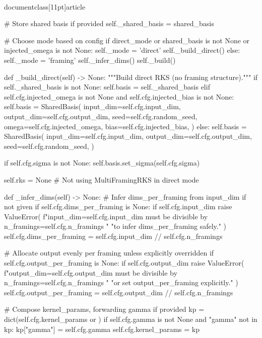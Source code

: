 \\documentclass[11pt]{article}
\begin{document}
\begin{CodeBlock}
        # Store shared basis if provided
        self._shared_basis = shared_basis
        
        # Choose mode based on config
        if direct_mode or shared_basis is not None or injected_omega is not None:
            self._mode = 'direct'
            self._build_direct()
        else:
            self._mode = 'framing'
            self._infer_dims()
            self._build()
    
    def _build_direct(self) -> None:
        """Build direct RKS (no framing structure)."""
        if self._shared_basis is not None:
            self.basis = self._shared_basis
        elif self.cfg.injected_omega is not None and self.cfg.injected_bias is not None:
            self.basis = SharedBasis(
                input_dim=self.cfg.input_dim,
                output_dim=self.cfg.output_dim,
                seed=self.cfg.random_seed,
                omega=self.cfg.injected_omega,
                bias=self.cfg.injected_bias,
            )
        else:
            self.basis = SharedBasis(
                input_dim=self.cfg.input_dim,
                output_dim=self.cfg.output_dim,
                seed=self.cfg.random_seed,
            )
        
        if self.cfg.sigma is not None:
            self.basis.set_sigma(self.cfg.sigma)
        
        self.rks = None  # Not using MultiFramingRKS in direct mode

    def _infer_dims(self) -> None:
        # Infer dims_per_framing from input_dim if not given
        if self.cfg.dims_per_framing is None:
            if self.cfg.input_dim %
                raise ValueError(
                    f"input_dim={self.cfg.input_dim} must be divisible by n_framings={self.cfg.n_framings} "
                    "to infer dims_per_framing safely."
                )
            self.cfg.dims_per_framing = self.cfg.input_dim // self.cfg.n_framings

        # Allocate output evenly per framing unless explicitly overridden
        if self.cfg.output_per_framing is None:
            if self.cfg.output_dim %
                raise ValueError(
                    f"output_dim={self.cfg.output_dim} must be divisible by n_framings={self.cfg.n_framings} "
                    "or set output_per_framing explicitly."
                )
            self.cfg.output_per_framing = self.cfg.output_dim // self.cfg.n_framings

        # Compose kernel_params, forwarding gamma if provided
        kp = dict(self.cfg.kernel_params or {})
        if self.cfg.gamma is not None and "gamma" not in kp:
            kp["gamma"] = self.cfg.gamma
        self.cfg.kernel_params = kp


\end{CodeBlock}
\end{document}
